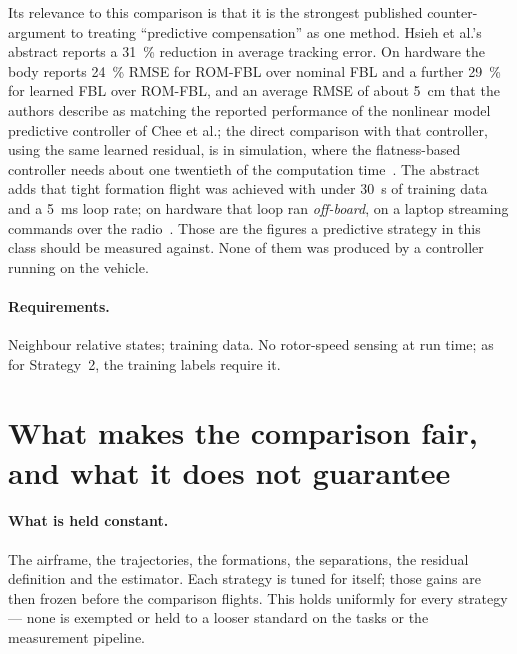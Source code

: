 Its relevance to this comparison is that it is the strongest published counter-argument to treating
``predictive compensation'' as one method. Hsieh et al.'s abstract reports a \SI{31}{\percent}
reduction in average tracking error. On hardware the body reports \SI{24}{\percent} RMSE for
ROM-FBL over nominal FBL and a further \SI{29}{\percent} for learned FBL over ROM-FBL, and an
average RMSE of about \SI{5}{\centi\metre} that the authors describe as matching the reported
performance of the nonlinear model predictive controller of Chee et al.; the direct comparison with
that controller, using the same learned residual, is in simulation, where the flatness-based
controller needs about one twentieth of the computation time~\cite{hsieh2026flatness}. The abstract
adds that tight formation flight was achieved with under \SI{30}{\second} of training data and a
\SI{5}{\milli\second} loop rate; on hardware that loop ran \emph{off-board}, on a laptop streaming
commands over the radio~\cite{hsieh2026flatness}.
Those are the figures a predictive strategy in this class should be measured against. None of them
was produced by a controller running on the vehicle.

\paragraph{Requirements.} Neighbour relative states; training data. No rotor-speed sensing at run
time; as for Strategy~2, the training labels require it.

\section{What makes the comparison fair, and what it does not guarantee}
\label{sec:ctrl-fairness}

\paragraph{What is held constant.} The airframe, the trajectories, the formations, the
separations, the residual definition and the estimator. Each strategy is tuned for itself; those
gains are then frozen before the comparison flights. This holds uniformly for every strategy — none
is exempted or held to a looser standard on the tasks or the measurement pipeline.

